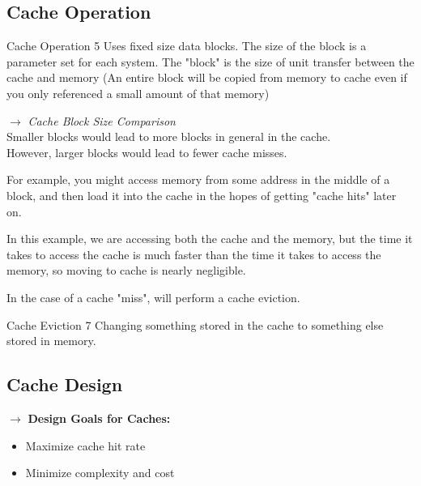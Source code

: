 \documentclass{report}
\begin{document}
  \subsection{Cache Operation}
  \begin{example} {Cache Operation} { 5 }
   Uses fixed size data blocks. The size of the block is a parameter set for each system. The "block" is the size of unit transfer between the cache and memory (An entire block will be copied from memory to cache even if you only referenced a small amount of that memory) \\

   \begin{note} 
     $\to$ \emph{Cache Block Size Comparison} \\
    Smaller blocks would lead to more blocks in general in the cache. \\
    However, larger blocks would lead to fewer cache misses. \\
   \end{note}

    For example, you might access memory from some address in the middle of a block, and then load it into the cache in the hopes of getting "cache hits" later on. \\

    \par In this example, we are accessing both the cache and the memory, but the time it takes to access the cache is much faster than the time it takes to access the memory, so moving to cache is nearly negligible. \\
    \par In the case of a cache "miss", will perform a cache eviction.
    \begin{definition} {Cache Eviction} { 7 }
     Changing something stored in the cache to something else stored in memory. \\
    \end{definition}

  \end{example}

  \subsection{Cache Design} 
    $\to$ \textbf{Design Goals for Caches:} 
    \begin{itemize} 
      \item Maximize cache hit rate
      \item Minimize complexity and cost \\
    \end{itemize}
\end{document}
